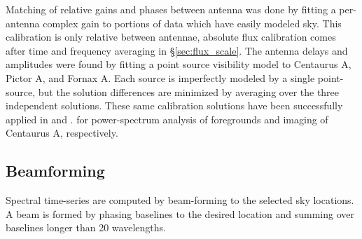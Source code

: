 \documentclass[preprint]{aastex}
\begin{document}
Matching of relative gains and phases between antenna was done by fitting a per-antenna complex gain to portions
of data which have easily modeled sky. 
This calibration is only relative between antennae, absolute flux calibration
comes after time and frequency averaging in  \S \ref{sec:flux_scale}.   
The antenna delays and amplitudes were found by fitting a point source visibility
model to Centaurus A, Pictor A, and Fornax A.  Each source is imperfectly
modeled by a single point-source, but the solution differences are minimized by
averaging over the three independent solutions. These same calibration
solutions have been successfully applied in \citet{Pober:2013p9567} and \citet{Stefan:2012p9707}.
for power-spectrum analysis of foregrounds and imaging of Centaurus A, respectively.



\subsection{Beamforming}

Spectral time-series are computed by beam-forming to the selected sky
locations. A beam is formed by phasing baselines to the desired location and
summing over baselines longer than 20 wavelengths.

\end{document}
